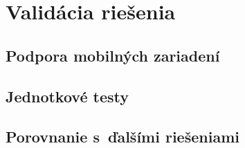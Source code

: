 \chapter{Validácia riešenia}


\section{Podpora mobilných zariadení}


\section{Jednotkové testy}
\section{Porovnanie s~ďalšími riešeniami}